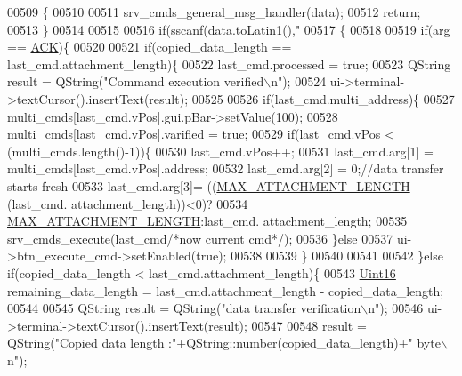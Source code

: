 \begin{DoxyCode}
{{{{{{{{{{{{{{{{{00509         \{
00510 
00511             srv\_cmds\_general\_msg\_handler(data);
00512             \textcolor{keywordflow}{return};
00513         \}
00514 
00515 
00516         \textcolor{keywordflow}{if}(sscanf(data.toLatin1(),\textcolor{stringliteral}{"%
00517         \{
00518 
00519            \textcolor{keywordflow}{if}(arg == \hyperlink{a00034_a6f6489887e08bff4887d0bc5dcf214d8}{ACK})\{
00520 
00521                \textcolor{keywordflow}{if}(copied\_data\_length == last\_cmd.attachment\_length)\{
00522                    last\_cmd.processed = \textcolor{keyword}{true};
00523                    QString result =  QString(\textcolor{stringliteral}{"Command execution verified\(\backslash\)n"});
00524                    ui->terminal->textCursor().insertText(result);
00525 
00526                    \textcolor{keywordflow}{if}(last\_cmd.multi\_address)\{
00527                         multi\_cmds[last\_cmd.vPos].gui.pBar->setValue(100);
00528                         multi\_cmds[last\_cmd.vPos].varified = \textcolor{keyword}{true};
00529                     \textcolor{keywordflow}{if}(last\_cmd.vPos < (multi\_cmds.length()-1))\{
00530                        last\_cmd.vPos++;
00531                        last\_cmd.arg[1] = multi\_cmds[last\_cmd.vPos].address;
00532                        last\_cmd.arg[2] = 0;\textcolor{comment}{//data transfer starts fresh}
00533                        last\_cmd.arg[3]= ((\hyperlink{a00031_aa8abe3a822c64813f7aaba3ca7e3db9c}{MAX\_ATTACHMENT\_LENGTH}-(last\_cmd.
      attachment\_length))<0)?
00534                                           \hyperlink{a00031_aa8abe3a822c64813f7aaba3ca7e3db9c}{MAX\_ATTACHMENT\_LENGTH}:last\_cmd.
      attachment\_length;
00535                        srv\_cmds\_execute(last\_cmd\textcolor{comment}{/*now current cmd*/});
00536                    \}\textcolor{keywordflow}{else}
00537                        ui->btn\_execute\_cmd->setEnabled(\textcolor{keyword}{true});
00538 
00539                    \}
00540 
00541 
00542                \}\textcolor{keywordflow}{else} \textcolor{keywordflow}{if}(copied\_data\_length < last\_cmd.attachment\_length)\{
00543                    \hyperlink{a00001_aae7407b021d43f7193a81a58cfb3e297}{Uint16} remaining\_data\_length = last\_cmd.attachment\_length - copied\_data\_length;
00544 
00545                    QString result =  QString(\textcolor{stringliteral}{"data transfer verification\(\backslash\)n"});
00546                    ui->terminal->textCursor().insertText(result);
00547 
00548                    result =  QString(\textcolor{stringliteral}{"Copied data length :"}+QString::number(copied\_data\_length)+\textcolor{stringliteral}{" byte\(\backslash\)n"});
}}}}}}}}}}}}}}}}}}
\end{DoxyCode}
